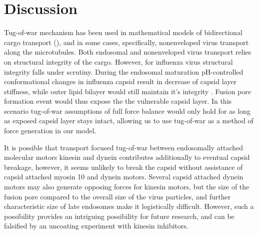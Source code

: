 \section{Discussion}

Tug-of-war mechanism \cite{hancock2014bidirectional} has been used in mathematical models of bidirectional cargo transport (\cite{muller2008tug}), and in some cases, specifically, nonenveloped virus transport \cite{gazzola2009stochastic} along the microtubules. Both endosomal and nonenveloped virus transport relies on structural integrity of the cargo. However, for influenza virus structural integrity falls under scrutiny. During the endosomal maturation pH-controlled conformational changes in influenza capsid result in decrease of capsid layer stiffness, while outer lipid bilayer would still maintain it's integrity \cite{li2014ph}. Fusion pore formation event would thus expose the the vulnerable capsid layer. In this scenario tug-of-war assumptions of full force balance would only hold for as long as exposed capsid layer stays intact, allowing us to use tug-of-war as a method of force generation in our model.

It is possible that transport focused tug-of-war between endosomally attached molecular motors kinesin and dynein contributes additionally to eventual capsid breakage, however, it seems unlikely to break the capsid  without assistance of capsid attached myosin 10 and dynein motors. Several capsid attached dynein motors may also generate opposing forces for kinesin motors, but the size of the fusion pore compared to the overall size of the virus particles, and further characteristic size of late endosomes make it logistically difficult. However, such a possibility provides an intriguing possibility for future research, and can be falsified by an uncoating experiment with kinesin inhibitors.
